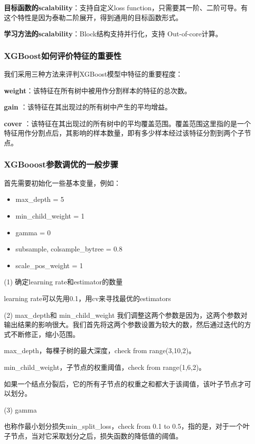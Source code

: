 \documentclass[12pt]{article}
\begin{document}
\textbf{目标函数的scalability}：支持自定义loss function，只需要其一阶、二阶可导。有这个特性是因为泰勒二阶展开，得到通用的目标函数形式。

\textbf{学习方法的scalability}：Block结构支持并行化，支持 Out-of-core计算。

\subsubsection{XGBoost如何评价特征的重要性}
我们采用三种方法来评判XGBoost模型中特征的重要程度：

\textbf{weight}：该特征在所有树中被用作分割样本的特征的总次数。

\textbf{gain} ：该特征在其出现过的所有树中产生的平均增益。

\textbf{cover} ：该特征在其出现过的所有树中的平均覆盖范围。覆盖范围这里指的是一个特征用作分割点后，其影响的样本数量，即有多少样本经过该特征分割到两个子节点。

\subsubsection{XGBooost参数调优的一般步骤}
首先需要初始化一些基本变量，例如：
\begin{itemize}
\setlength{\itemsep}{0pt}
\setlength{\parsep}{0pt}
\setlength{\parskip}{0pt}
    \item max\_depth = 5
    \item min\_child\_weight = 1
    \item gamma = 0
    \item subsample, colsample\_bytree = 0.8
    \item scale\_pos\_weight = 1
\end{itemize}

(1) 确定learning rate和estimator的数量

learning rate可以先用0.1，用cv来寻找最优的estimators

(2) max\_depth和 min\_child\_weight
我们调整这两个参数是因为，这两个参数对输出结果的影响很大。我们首先将这两个参数设置为较大的数，然后通过迭代的方式不断修正，缩小范围。

max\_depth，每棵子树的最大深度，check from range(3,10,2)。

min\_child\_weight，子节点的权重阈值，check from range(1,6,2)。

如果一个结点分裂后，它的所有子节点的权重之和都大于该阈值，该叶子节点才可以划分。

(3) gamma

也称作最小划分损失min\_split\_loss，check from 0.1 to 0.5，指的是，对于一个叶子节点，当对它采取划分之后，损失函数的降低值的阈值。
\end{document}
